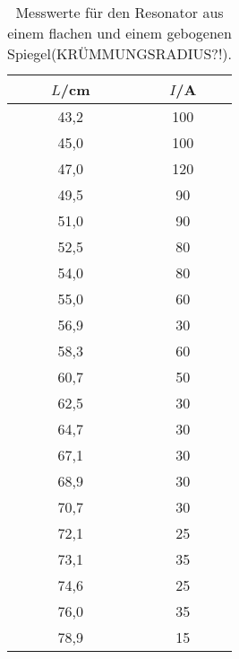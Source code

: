 \newpage
{}
\label{sec:Anhang}

\begin{table}[htp]
  \caption{Messwerte für den Resonator aus einem flachen und einem gebogenen Spiegel(KRÜMMUNGSRADIUS?!).}
  \label{tab:plankonkav}
	\begin{center}
		\begin{tabular}{cc}
		\toprule
			{$L$/cm} & {$I$/\mu A}\\
			\midrule
			43,2 & 100\\
			45,0 & 100\\
			47,0 & 120\\
			49,5 & 90\\
			51,0 & 90\\
			52,5 & 80\\
			54,0 & 80\\
			55,0 & 60\\
			56,9 & 30\\
			58,3 & 60\\
			60,7 & 50\\
			62,5 & 30\\
			64,7 & 30\\
			67,1 & 30\\
			68,9 & 30\\
			70,7 & 30\\
			72,1 & 25\\
			73,1 & 35\\
			74,6 & 25\\
			76,0 & 35\\
			78,9 & 15\\
		\bottomrule
		\end{tabular}
	\end{center}
\end{table}

